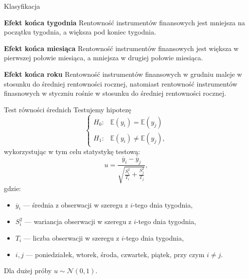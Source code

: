 \documentclass[a4paper, 11pt]{beamer}
\begin{document}
	\begin{frame}{Klasyfikacja}
		\begin{block}{\textbf{Efekt końca tygodnia}}
			Rentowność instrumentów finansowych jest mniejsza na początku tygodnia, a
			większa pod koniec tygodnia.
		\end{block}
		\begin{block}{\textbf{Efekt końca miesiąca}}
			Rentowność instrumentów finansowych jest większa w pierwszej połowie 
			miesiąca, a mniejsza w drugiej połowie miesiąca.
		\end{block}
		\begin{block}{\textbf{Efekt końca roku}}
			Rentowność instrumentów finansowych w grudniu maleje w stosunku do 
			średniej rentowności rocznej, natomiast rentowność instrumentów 
			finasnowych w styczniu rośnie w stosunku do średniej rentowności rocznej.
		\end{block}
	\end{frame}
	
	\begin{frame}{Test równości średnich}
		Testujemy hipotezę \[
				\begin{cases}
					H_{0}: & \mathbb{E}\left(y_i\right) = \mathbb{E}\left(y_j\right)\\
					H_{1}: & \mathbb{E}\left(y_i\right) \neq \mathbb{E}\left(y_j\right),
				\end{cases}
			\]
		wykorzystując w tym celu statystykę testową: \[
				u=\frac{\overline{y}_i - \overline{y}_j}{ \sqrt{\frac{S_i^2}{T_i} + \frac{S_j^2}{T_j}}} ,
			\]
		gdzie:
		\begin{itemize}
			\item $\overline{y}_i$ --- średnia z obserwacji w szeregu z $i$-tego dnia tygodnia,
			\item $S_i^2$ --- wariancja obserwacji w szeregu z $i$-tego dnia tygodnia,
			\item $T_i$ --- liczba obserwacji w szeregu z $i$-tego dnia tygodnia,
			\item $i,j$ --- poniedziałek, wtorek, środa, czwartek, piątek, przy czym $i \neq j$.
		\end{itemize}
		Dla dużej próby $u \sim \mathcal{N}\left(0,1\right).$
	\end{frame}
	
\end{document}

